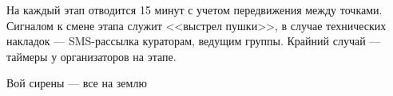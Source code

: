 
\par На каждый этап отводится 15 минут с учетом передвижения между точками. Сигналом к смене этапа служит <<выстрел пушки>>, в случае технических накладок --- SMS-рассылка кураторам, ведущим группы. Крайний случай --- таймеры у организаторов на этапе.

\par Вой сирены --- все на землю









